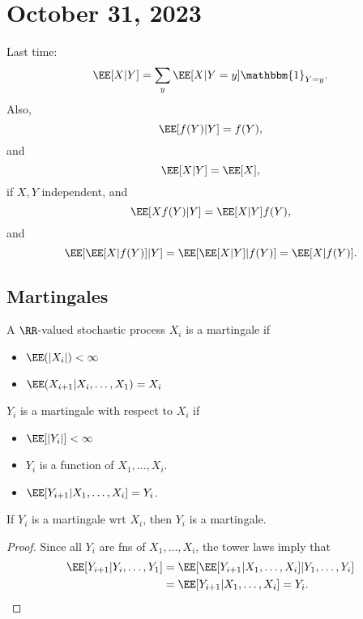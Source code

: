 \section{October 31, 2023}

Last time: 
\[\EE[X|Y] = \sum_y \EE[X|Y=y]\mathbbm{1}_{Y=y}.\]
Also, 
\[\EE[f(Y)|Y] = f(Y),\]
and
\[\EE[X|Y] = \EE[X],\]
if $X,Y$ independent, and
\[\EE[Xf(Y)|Y] = \EE[X|Y]f(Y),\]
and
\[\EE[\EE[X|f(Y)]|Y] = \EE[\EE[X|Y]|f(Y)] = \EE[X|f(Y)].\]

\subsection{Martingales}

\begin{definition}

A $\RR$-valued stochastic process $X_i$ is a \ac{martingale} if 
\begin{itemize}
	\item $\EE(\vert X_i\vert) < \infty$
	\item $\EE(X_{i+1}|X_i,\hdots,X_1)=X_i$
\end{itemize}
\end{definition}

\begin{definition}

$Y_i$ is a martingale with respect to $X_i$ if 
\begin{itemize}
	\item $\EE[\vert Y_i\vert] < \infty$
	\item $Y_i$ is a function of $X_1, \hdots, X_i$.
	\item $\EE[Y_{i+1}|X_1,\hdots, X_i] = Y_i$. 
\end{itemize}
\end{definition}

\begin{theorem}
\proplabel

If $Y_i$ is a martingale wrt $X_i$, then $Y_i$ is a martingale. 
\end{theorem}

\begin{proof}
Since all $Y_i$ are fns of $X_1, \hdots, X_i$, the tower laws imply that 
\begin{align*}
	\EE[Y_{i+1}|Y_i,\hdots,Y_1] &= \EE[\EE[Y_{i+1}|X_1,\hdots,X_i]|Y_1,\hdots, Y_i] \\
															&= \EE[Y_{i+1}|X_1, \hdots, X_i] = Y_i.
\end{align*}
\end{proof}

